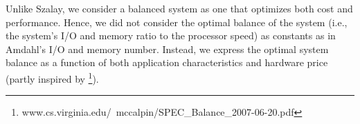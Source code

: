 \documentclass[journal]{IEEEtran}
\begin{document}
Unlike Szalay, we consider a balanced system as one that optimizes both cost and performance. Hence, we did not consider the optimal balance of the system (i.e., the system's I/O and memory ratio to the processor speed) as constants as in Amdahl's I/O and memory number. Instead, we express the optimal system balance  as a function of both application characteristics and hardware price (partly inspired by \footnote{www.cs.virginia.edu/~mccalpin/SPEC\_Balance\_2007-06-20.pdf}). 


\end{document}
